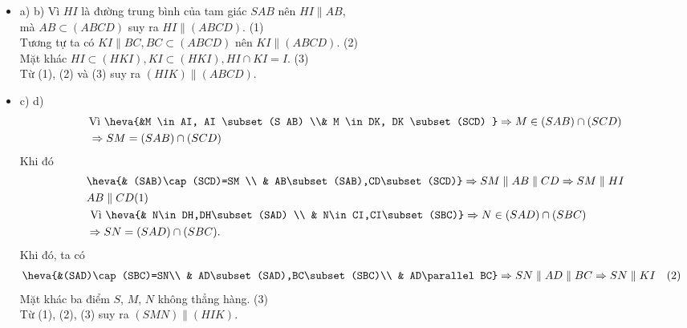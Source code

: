 \begin{ex}
{\begin{center}
		\end{center}
		\begin{itemize}
			\item a) b) Vì $HI$ là đường trung bình của tam giác $SAB$ nên $H I\parallel AB$, \\
		mà $AB \subset(ABCD) $ suy ra $ HI \parallel (ABCD)$. (1)\\
		Tương tự ta có $KI \parallel  BC, BC \subset(ABCD) $ nên $KI \parallel (ABCD)$. (2)\\
		Mặt khác $HI \subset(HKI), KI \subset(HKI), HI \cap KI=I$. (3)\\
		Từ (1), (2) và (3) suy ra $(HIK) \parallel(ABCD)$.\\
		\item c) d) 
		$$\begin{aligned}
				& \text {Vì }\heva{&M \in AI, AI \subset(S AB) \\&
					M \in DK, DK \subset(SCD)
				} \Rightarrow M \in(SAB) \cap(SCD)\\
				& \Rightarrow SM=(SAB) \cap(SCD) 
			\end{aligned}
		$$
		Khi đó
		$$\begin{aligned}
			& \heva{&  (SAB)\cap (SCD)=SM \\ & AB\subset (SAB),CD\subset (SCD)}\Rightarrow SM\parallel AB\parallel CD\Rightarrow SM\parallel HI \\ & AB\parallel CD (1) \\ 
			& \text{ Vì }\heva{&  N\in DH,DH\subset (SAD) \\ & N\in CI,CI\subset (SBC)}\Rightarrow N\in (SAD)\cap (SBC) \\ 
			& \Rightarrow SN=(SAD)\cap (SBC).
		\end{aligned}$$
		Khi đó, ta có
		$$
		\begin{aligned}
		\heva{&(SAD)\cap(SBC)=SN\\ & AD\subset(SAD),BC\subset(SBC)\\ & AD\parallel BC}&\Rightarrow SN\parallel AD\parallel BC\Rightarrow SN\parallel KI\quad (2)
			\end{aligned}$$
		Mặt khác ba điểm $S$, $M$, $N$ không thẳng hàng. (3) \\
		Từ (1), (2), (3) suy ra $(SMN) \parallel(HIK)$.
	\end{itemize}
	}
\end{ex}


